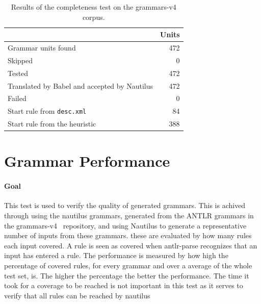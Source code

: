 \documentclass[thesis]{plai}
\begin{document}
\begin{table}[htbp]
    \centering
    \begin{tabular}{@{}lr@{}}
        \toprule
        & \textbf{Units} \\
        \midrule
        Grammar units found                          & 472 \\
        Skipped                                      & 0   \\
        Tested                                       & 472 \\
        Translated by Babel and accepted by Nautilus & 472 \\
        Failed                                       & 0   \\
        \midrule
        Start rule from \texttt{desc.xml}            & 84  \\
        Start rule from the heuristic                & 388 \\
        \bottomrule
    \end{tabular}
    \caption{Results of the completeness test on the grammars-v4 corpus.}
    \label{tab:eval-completeness}
\end{table}

\section{Grammar Performance}
\label{section:eval-performance}
\paragraph{Goal}
This test is used to verify the quality of generated grammars. This is achived through using the nautilus grammars, generated from the ANTLR grammars in the grammars-v4~\cite{grammars-v4} repository, and using Nautilus to generate a representative number of inputs from these grammars. these are evaluated by how many rules each input covered. A rule is seen as covered when antlr-parse recognizes that an input has entered a rule. The performance is measured by how high the percentage of covered rules, for every grammar and over a average of the whole test set, is. The higher the percentage the better the performance. The time it took for a coverage to be reached is not important in this test as it serves to verify that all rules can be reached by nautilus
\end{document}
